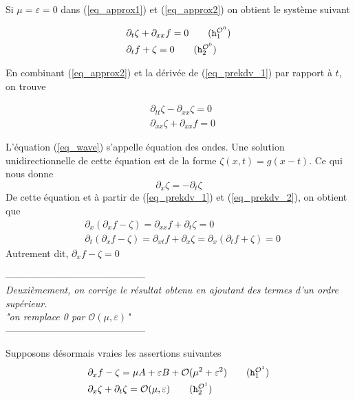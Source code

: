 \documentclass[12pt,a4paper]{article}
\numberwithin{equation}{section}
\begin{document}
Si $\mu = \varepsilon = 0$ dans (\ref{eq_approx1}) et (\ref{eq_approx2}) on obtient le système suivant

\begin{align}
    &\partial_t\zeta + \partial_{xx}f = 0 \label{eq_prekdv_1}  \tag{$\texttt{h}_1^{\mathcal{O}^0}$}\\
    &\partial_tf + \zeta = 0 \label{eq_prekdv_2} \tag{$\texttt{h}_2^{\mathcal{O}^0}$}
\end{align}

En combinant (\ref{eq_approx2}) et la dérivée de (\ref{eq_prekdv_1}) par rapport à $t$, on trouve

\begin{align}
    &\partial_{tt} \zeta - \partial_{xx}\zeta = 0 \label{eq_wave}\\
    &\partial_{xx} \zeta + \partial_{xx}f = 0 \label{eq_duality}
\end{align}

L'équation (\ref{eq_wave}) s'appelle équation des ondes. Une solution unidirectionnelle de cette équation est de la forme $\zeta(x,t) = g(x-t)$. Ce qui nous donne
\begin{equation*}
    \partial_x\zeta = - \partial_t \zeta 
\end{equation*}
De cette équation et à partir de (\ref{eq_prekdv_1}) et (\ref{eq_prekdv_2}),  on obtient que 
\begin{align*}
   &\partial_x(\partial_xf-\zeta) = \partial_{xx}f+\partial_t\zeta = 0\\
   &\partial_t(\partial_xf-\zeta) = \partial_{xt}f+\partial_x\zeta = \partial_{x}(\partial_{t}f+\zeta) = 0
\end{align*}
Autrement dit, $\partial_xf-\zeta = 0$

\begin{center}
    --------------------------------------------\\
    \textit{Deuxièmement, on corrige le résultat obtenu en ajoutant des termes d'un ordre supérieur.}\\
   \textit{"on remplace 0 par $\mathcal{O}(\mu,\varepsilon)$"}\\
   --------------------------------------------
\end{center}
Supposons désormais vraies les assertions suivantes
\begin{align}
    &\partial_xf - \zeta = \mu A + \varepsilon B + \mathcal{O}(\mu^2+\varepsilon^2) \label{hyp_prekdv1} \tag{$\texttt{h}_1^{\mathcal{O}^1}$} \\
    & \partial_x \zeta + \partial_t\zeta = \mathcal{O}(\mu, \varepsilon) \label{hyp_prekdv2} \tag{$\texttt{h}_2^{\mathcal{O}^1}$}
\end{align}
\end{document}
